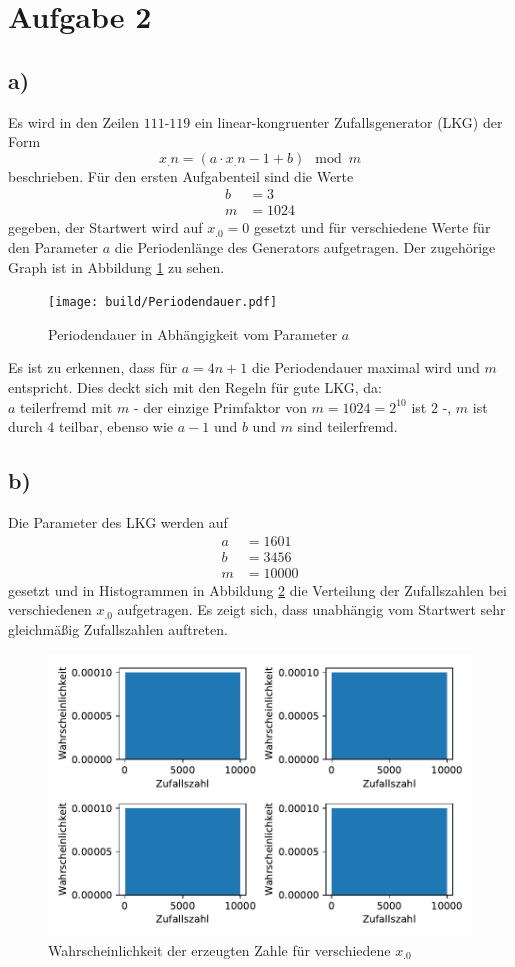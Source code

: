\section{Aufgabe 2}
\label{sec:Aufgabe2}
\subsection*{a)}
Es wird in den Zeilen $111$-$119$ ein linear-kongruenter Zufallsgenerator (LKG) der Form
\begin{equation}
x_.n=(a\cdot x_.{n-1}+b)\mod m \label{eq:LKG}
\end{equation}
beschrieben. Für den ersten Aufgabenteil sind die Werte
\begin{align*}
b&=3\\
m&=1024
\end{align*}
gegeben, der Startwert wird auf $x_.0=0$ gesetzt und für verschiedene Werte für den Parameter $a$ die Periodenlänge des Generators aufgetragen.
Der zugehörige Graph ist in Abbildung \ref{fig:period} zu sehen.
\begin{figure}
  \texttt{[image: build/Periodendauer.pdf]}
  \caption{Periodendauer in Abhängigkeit vom Parameter $a$}
  \label{fig:period}
\end{figure}
Es ist zu erkennen, dass für $a = 4n +1$ die Periodendauer maximal wird und $m$ entspricht. Dies deckt sich mit den Regeln für gute LKG, da:\\
$a$ teilerfremd mit $m$ - der einzige Primfaktor von $m=1024=2^{10}$ ist $2$ -, $m$ ist durch $4$ teilbar, ebenso wie $a-1$ und $b$ und $m$ sind teilerfremd.
\subsection*{b)}
Die Parameter des LKG werden auf
\begin{align*}
a&=1601\\
b&=3456\\
m&=10000
\end{align*}
gesetzt und in Histogrammen in Abbildung \ref{fig:Wahrkeit} die Verteilung der Zufallszahlen bei verschiedenen $x_.0$ aufgetragen.
Es zeigt sich, dass unabhängig vom Startwert sehr gleichmäßig Zufallszahlen auftreten.
\begin{figure}
  \includegraphics{Wahrschkeit.pdf}
  \caption{Wahrscheinlichkeit der erzeugten Zahle für verschiedene $x_.0$}
  \label{fig:Wahrkeit}
\end{figure}
